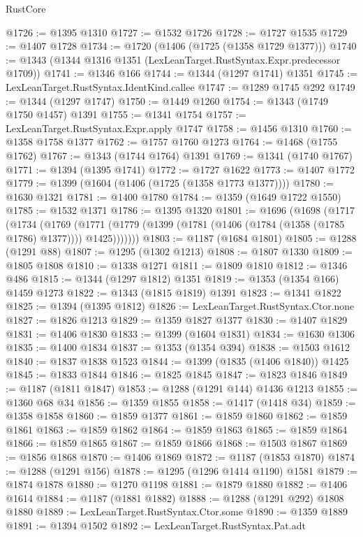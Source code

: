 \begin{lexlean}{RustCore}
\begin{coremodule}
{\begin{coremodule}
{{{{{{{{{{{{{{{{{{{{{{{{{{{{{{{{{{{{{{{{{{{{@1726 := @1395 @1310
@1727 := @1532 @1726
@1728 := @1727 @1535
@1729 := @1407 @1728
@1734 := @1720 (@1406 (@1725 (@1358 @1729 @1377)))
@1740 := @1343 (@1344 @1316 @1351 (LexLeanTarget.RustSyntax.Expr.predecessor @1709))
@1741 := @1346 @166
@1744 := @1344 (@1297 @1741) @1351
@1745 := LexLeanTarget.RustSyntax.IdentKind.callee
@1747 := @1289 @1745 @292
@1749 := @1344 (@1297 @1747)
@1750 := @1449 @1260
@1754 := @1343 (@1749 @1750 @1457) @1391
@1755 := @1341 @1754
@1757 := LexLeanTarget.RustSyntax.Expr.apply @1747
@1758 := @1456 @1310
@1760 := @1358 @1758 @1377
@1762 := @1757 @1760 @1273
@1764 := @1468 (@1755 @1762)
@1767 := @1343 (@1744 @1764) @1391
@1769 := @1341 (@1740 @1767)
@1771 := @1394 (@1395 @1741)
@1772 := @1727 @1622
@1773 := @1407 @1772
@1779 := @1399 (@1604 (@1406 (@1725 (@1358 @1773 @1377))))
@1780 := @1630 @1321
@1781 := @1400 @1780
@1784 := @1359 (@1649 @1722 @1550)
@1785 := @1532 @1371
@1786 := @1395 @1320
@1801 := @1696
    (@1698
      (@1717
        (@1734
          (@1769
            (@1771 (@1779 (@1399 (@1781 (@1406 (@1784 (@1358 (@1785 @1786) @1377)))) @1425)))))))
@1803 := @1187 (@1684 @1801)
@1805 := @1288 (@1291 @88)
@1807 := @1295 (@1302 @1213)
@1808 := @1807 @1330
@1809 := @1805 @1808
@1810 := @1338 @1271
@1811 := @1809 @1810
@1812 := @1346 @486
@1815 := @1344 (@1297 @1812) @1351
@1819 := @1353 (@1354 @166) @1459 @1273
@1822 := @1343 (@1815 @1819) @1391
@1823 := @1341 @1822
@1825 := @1394 (@1395 @1812)
@1826 := LexLeanTarget.RustSyntax.Ctor.none
@1827 := @1826 @1213
@1829 := @1359 @1827 @1377
@1830 := @1407 @1829
@1831 := @1406 @1830
@1833 := @1399 (@1604 @1831)
@1834 := @1630 @1306
@1835 := @1400 @1834
@1837 := @1353 (@1354 @394)
@1838 := @1503 @1612
@1840 := @1837 @1838 @1523
@1844 := @1399 (@1835 (@1406 @1840)) @1425
@1845 := @1833 @1844
@1846 := @1825 @1845
@1847 := @1823 @1846
@1849 := @1187 (@1811 @1847)
@1853 := @1288 (@1291 @144) @1436 @1213
@1855 := @1360 @68 @34
@1856 := @1359 @1855
@1858 := @1417 (@1418 @34)
@1859 := @1358 @1858
@1860 := @1859 @1377
@1861 := @1859 @1860
@1862 := @1859 @1861
@1863 := @1859 @1862
@1864 := @1859 @1863
@1865 := @1859 @1864
@1866 := @1859 @1865
@1867 := @1859 @1866
@1868 := @1503 @1867
@1869 := @1856 @1868
@1870 := @1406 @1869
@1872 := @1187 (@1853 @1870)
@1874 := @1288 (@1291 @156)
@1878 := @1295 (@1296 @1414 @1190) @1581
@1879 := @1874 @1878
@1880 := @1270 @1198
@1881 := @1879 @1880
@1882 := @1406 @1614
@1884 := @1187 (@1881 @1882)
@1888 := @1288 (@1291 @292) @1808 @1880
@1889 := LexLeanTarget.RustSyntax.Ctor.some
@1890 := @1359 @1889
@1891 := @1394 @1502
@1892 := LexLeanTarget.RustSyntax.Pat.adt
}}}}}}}}}}}}}}}}}}}}}}}}}}}}}}}}}}}}}}}}}}}}
\end{coremodule}}
\end{coremodule}
\end{lexlean}
